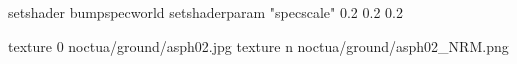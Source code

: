setshader bumpspecworld
setshaderparam "specscale" 0.2 0.2 0.2

texture 0 noctua/ground/asph02.jpg
texture n noctua/ground/asph02_NRM.png
